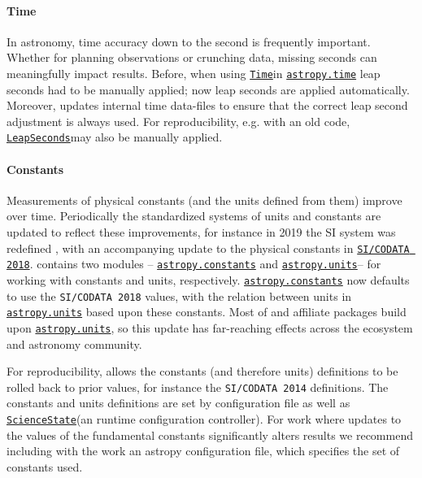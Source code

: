 \documentclass[modern]{aastex631}
\newcommand{\astropysubpkg}[1]{\href{http://docs.astropy.org/en/stable/#1/index.html}{\texttt{astropy.#1}}\xspace}
\newcommand{\astropyunits}{\astropysubpkg{units}}
\newcommand{\astropyconstants}{\astropysubpkg{constants}}
\newcommand{\astropytime}{\astropysubpkg{time}}
\newcommand{\astropyapi}[2]{\href{https://docs.astropy.org/en/stable/api/astropy.#1.html}{#2}}
\newcommand{\astropyapidoc}[2]{\astropyapi{#1}{\texttt{#2}\xspace}}
\newcommand{\astropyTime}{\astropyapidoc{time.Time}{Time}}
\newcommand{\astropyLeapSeconds}{\astropyapidoc{time.LeapSeconds}{LeapSeconds}}
\newcommand{\astropyScienceState}{\astropyapidoc{utils.state.ScienceState}{ScienceState}}
\begin{document}
  \paragraph{Time}

    In astronomy, time accuracy down to the second is frequently important.
    Whether for planning observations or crunching data, missing seconds can
    meaningfully impact results. Before, when using \astropyTime in \astropytime
    leap seconds had to be manually applied; now leap seconds are applied
    automatically. Moreover, \astropypkg updates internal time data-files to
    ensure that the correct leap second adjustment is always used. For
    reproducibility, e.g. with an old code, \astropyLeapSeconds may also be
    manually applied.

  \paragraph{Constants}

    Measurements of physical constants (and the units defined from them) improve
    over time. Periodically the standardized systems of units and constants are
    updated to reflect these improvements, for instance in 2019 the SI system was
    redefined \citep{NIST2019}, with an accompanying update to the physical
    constants in
    \href{https://codata.org/initiatives/data-science-and-stewardship/fundamental-physical-constants/}{\texttt{SI/CODATA
    2018}}. \astropypkg contains two modules -- \astropyconstants and
    \astropyunits -- for working with constants and units, respectively.
    \astropyconstants now defaults to use the \texttt{SI/CODATA 2018} values, with
    the relation between units in \astropyunits based upon these constants. Most
    of \astropypkg and affiliate packages build upon \astropyunits, so this update
    has far-reaching effects across the \astropy ecosystem and astronomy
    community.

    For reproducibility, \astropypkg allows the constants (and therefore units)
    definitions to be rolled back to prior values, for instance the
    \texttt{SI/CODATA 2014} definitions.
    The constants and units definitions are set by configuration file as well as
    \astropyScienceState (an runtime configuration controller). For work where
    updates to the values of the fundamental constants significantly alters
    results we recommend including with the work an astropy configuration file,
    which specifies the set of constants used.
\end{document}
